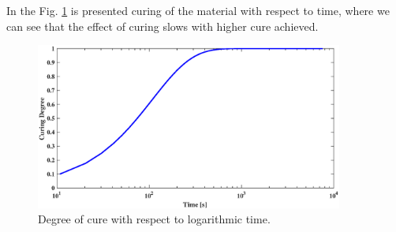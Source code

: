 In the Fig. \ref{obr:Curing_curing} is presented curing of the material with respect to time, where we can see that the effect of curing slows with higher cure achieved. 

\begin{figure}[h!]
	\centering
	\includegraphics[width=0.9\textwidth]{obrazky/CD-t.eps}
	\caption[Degree of cure with respect to time]{Degree of cure with respect to logarithmic time.}\label{obr:Curing_curing}
\end{figure}
